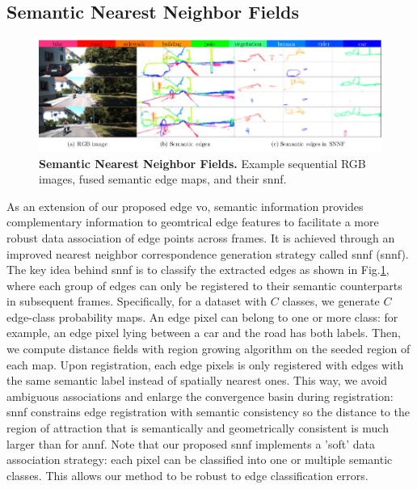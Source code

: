 \subsection{Semantic Nearest Neighbor Fields} 

\begin{figure}[t]
	\centering
	\includegraphics[width=\linewidth]{figures/illumination/semantics_snnf.pdf}
  	\caption[Semantic Nearest Neighbor Fields]{\textbf{Semantic Nearest Neighbor Fields.} Example sequential RGB images, fused semantic edge maps, and their \acrshort{snnf}.
	\label{fig:semantics_snnf}}
\end{figure}

As an extension of our proposed edge \acrshort{vo}, semantic information provides complementary information to geomtrical edge features to facilitate a more robust data association of edge points across frames.
It is achieved through an improved nearest neighbor correspondence generation strategy called \acrlong{snnf} (\acrshort{snnf}).
The key idea behind \acrshort{snnf} is to classify the extracted edges as shown in
Fig.\ref{fig:semantics_snnf}, where each group of edges can only be registered to their semantic counterparts in subsequent frames. 
Specifically, for a dataset with $C$ classes, we generate $C$ edge-class probability maps. 
An edge pixel can belong to one or more class: for example, an edge pixel lying between a car and the road has both labels. 
Then, we compute distance fields with region growing algorithm on the seeded region of each map. 
Upon registration, each edge pixels is only registered with edges with the same semantic label instead of spatially nearest ones. 
This way, we avoid ambiguous associations and enlarge the convergence basin during registration: 
\acrshort{snnf} constrains edge registration with semantic consistency so the distance to the region of attraction that is semantically and geometrically consistent is much larger than for \acrshort{annf}. 
Note that our proposed \acrshort{snnf} implements a 'soft' data association strategy: each pixel can be classified into one or multiple semantic classes. 
This allows our method to be robust to edge classification errors.

